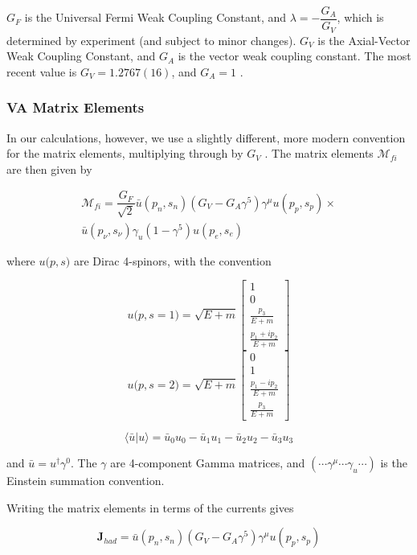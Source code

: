 \documentclass[%
 aip,
 jmp,%
 amsmath,amssymb,
 reprint,%
]{revtex4-1}
\begin{document}
$G_{F}$ is the Universal Fermi Weak Coupling Constant, and $\lambda=-\dfrac{G_{A}}{G_{V}}$, which is determined by experiment (and subject to minor changes). 
 $G_{V}$ is the Axial-Vector Weak Coupling Constant, and $G_{A}$ is the vector weak coupling
constant.  The most recent value is $G_{V}=1.2767(16)$, and $G_{A}=1$ \cite{vacoupling}.


\subsubsection{VA Matrix Elements}

In our calculations, however, we use a slightly different, more modern convention for the matrix elements, multiplying through by $G_{V}$ \cite{zuber}.   The matrix elements $\mathcal{M}_{fi}$ are then given by

\begin{multline}
\mathcal{M}_{fi}=\dfrac{G_{F}}{\sqrt{2}}\bar{u}(p_{n},s_{n})(G_{V}-G_{A}\gamma^{5})\gamma^{\mu}u(p_{p},s_{p})\times \\
\bar{u}(p_{\nu},s_{\nu})\gamma_{u}(1-\gamma^{5})u(p_{e},s_{e})
\end{multline}

where $u{(p},s)$ are Dirac 4-spinors, with the convention 

$$u{(p},s=1)=\sqrt{E+m}\left[\begin{array}{c}
1\\
0\\
\frac{p_{3}}{E+m}\\
\frac{p_{1}+ip_{2}}{E+m}
\end{array}\right]$$
$$u{(p},s=2)=\sqrt{E+m}\left[\begin{array}{c}
0\\
1\\
\frac{p_{1}-ip_{2}}{E+m}\\
\frac{p_{3}}{E+m}
\end{array}\right]$$

$$\langle\bar{u}|u\rangle=\bar{u}_{0}u_{0}-\bar{u}_{1}u_{1}-\bar{u}_{2}u_{2}-\bar{u}_{3}u_{3}$$

and $\bar{u}=u^{\dagger}\gamma^{0}$.  The $\gamma$ are 4-component Gamma matrices, and  $(\cdots\gamma^{\mu}\cdots\gamma_{u}\cdots)$ is the Einstein summation convention. 

Writing the matrix elements in terms of the currents gives

$$\mathbf{J}_{had}=\bar{u}(p_{n},s_{n})(G_{V}-G_{A}\gamma^{5})\gamma^{\mu}u(p_{p},s_{p})$$
\end{document}
